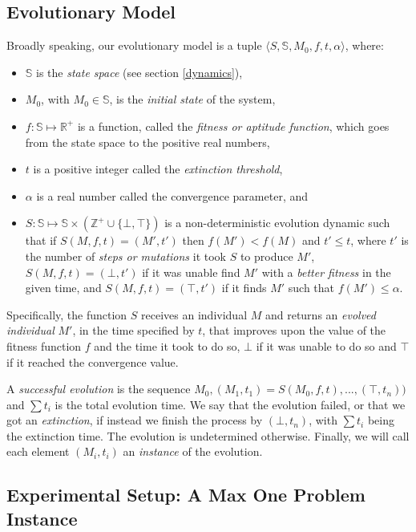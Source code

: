 \documentclass[10pt]{article}
\begin{document}
\subsection{Evolutionary Model}

Broadly speaking, our evolutionary model is a tuple $\langle S, \mathbb{S},M_0,f,t, \alpha\rangle $, where: 
 \begin{itemize}
  \item $\mathbb{S}$ is the \textit{state space} (see section \ref{dynamics}), 
  \item $M_0$, with $M_0\in\mathbb{S}$, is the \textit{initial state} of the system,
  \item $f:\mathbb{S}\mapsto\mathbb{R}^+$ is a function, called the \textit{fitness or aptitude function}, which goes from the state space to the positive real numbers,
  \item $t$ is a positive integer called the \textit{extinction threshold},
  \item $\alpha$ is a real number called the convergence parameter, and
  \item $S:\mathbb{S}\mapsto\mathbb{S}\times(\mathbb{Z}^+\cup\{\bot,\top\})$ is a non-deterministic evolution dynamic such that if $S(M,f,t)=(M',t')$ then
 $f(M')<f(M)$ and $t' \leq t$, where $t'$ is the number of \textit{steps or mutations} it took $S$ to produce $M'$, $S(M,f,t)=(\bot,t')$ if it was unable find $M'$ with a \textit{better fitness} in the given time, and $S(M,f,t)=(\top,t')$ if it finds $M'$ such that $f(M')\leq\alpha$. 
 \end{itemize}
 
\noindent{}Specifically, the function $S$ receives an individual $M$ and returns an \textit{evolved individual} $M'$, in the time specified by $t$, that improves upon the value of the fitness function $f$ and the time it took to do so, $\bot$ if it was unable to do so and $\top$ if it reached the convergence value.

A \textit{successful evolution} is the sequence $M_0,(M_{1},t_1)=S(M_0,f,t),...,(\top,t_n))$ and $\sum t_i$ is the total evolution time. We say that the evolution failed, or that we got an  \textit{extinction}, if instead we finish the process by $(\bot,t_n)$, with $\sum t_i$ being the extinction time. The evolution is undetermined otherwise. Finally, we will call each element $(M_{i},t_i)$ an \textit{instance} of the evolution.

\subsection{Experimental Setup: A Max One Problem Instance}
\end{document}
